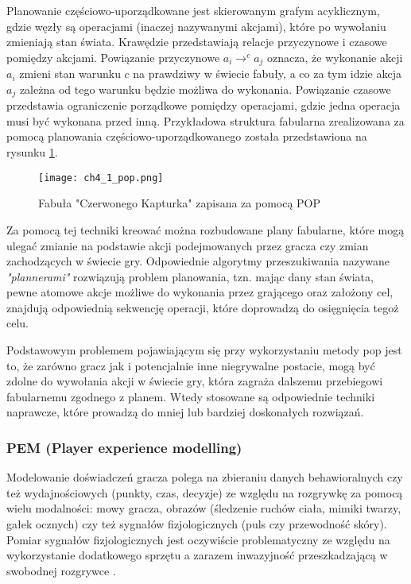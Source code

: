 Planowanie częściowo-uporządkowane jest skierowanym grafym acyklicznym, gdzie węzły są operacjami
(inaczej nazywanymi akcjami), które po wywołaniu zmieniają stan świata. Krawędzie przedstawiają
relacje przyczynowe i czasowe pomiędzy akcjami. Powiązanie przyczynowe $a_{i} \rightarrow^{c}a_{j}$
oznacza, że wykonanie akcji $a_{i}$ zmieni stan warunku $c$ na prawdziwy w świecie fabuły, a co za
tym idzie akcja $a_{j}$ zależna od tego warunku będzie możliwa do wykonania. Powiązanie czasowe
przedstawia ograniczenie porządkowe pomiędzy operacjami, gdzie jedna operacja musi być wykonana przed
inną\cite{game_ai_storytelling}. Przykładowa struktura fabularna zrealizowana za pomocą planowania
częściowo-uporządkowanego została przedstawiona na rysunku \ref{fig:ch4_1_pop}.

\begin{figure}[h]
    \centering
    \texttt{[image: ch4\_1\_pop.png]}
    \caption{Fabuła "Czerwonego Kapturka" zapisana za pomocą POP}
    \label{fig:ch4_1_pop}
\end{figure}

Za pomocą tej techniki kreować można rozbudowane plany fabularne, które mogą ulegać zmianie na
podstawie akcji podejmowanych przez gracza czy zmian zachodzących w świecie gry. Odpowiednie algorytmy
przeszukiwania nazywane \textit{"plannerami"} rozwiązują problem planowania, tzn. mając dany stan
świata, pewne atomowe akcje możliwe do wykonania przez grającego oraz założony cel, znajdują
odpowiednią sekwencję operacji, które doprowadzą do osięgnięcia tegoż celu\cite{game_ai_storytelling}.

Podstawowym problemem pojawiającym się przy wykorzystaniu metody \gls{pop} jest to, że zarówno gracz jak i
potencjalnie inne niegrywalne postacie, mogą być zdolne do wywołania akcji w świecie gry, która
zagraża dalszemu przebiegowi fabularnemu zgodnego z planem\cite{characters_and_directors}. Wtedy
stosowane są odpowiednie techniki naprawcze, które prowadzą do mniej lub bardziej doskonałych rozwiązań.

\subsubsection*{PEM (Player experience modelling)}

Modelowanie doświadczeń gracza polega na zbieraniu danych behawioralnych czy też wydajnościowych
(punkty, czas, decyzje) ze względu na rozgrywkę za pomocą wielu modalności: mowy gracza, obrazów
(śledzenie ruchów ciała, mimiki twarzy, gałek ocznych) czy też sygnałów fizjologicznych (puls czy
przewodność skóry). Pomiar sygnałów fizjologicznych jest oczywiście problematyczny ze względu na
wykorzystanie dodatkowego sprzętu a zarazem inwazyjność przeszkadzającą w swobodnej rozgrywce
\cite{reusable_game_ai}.

